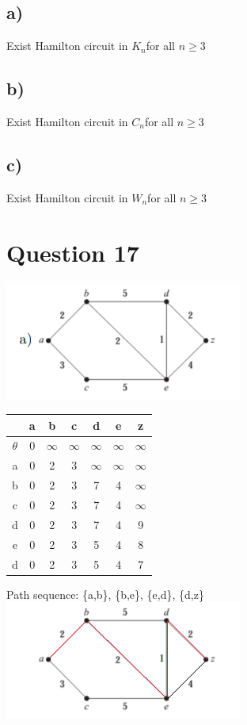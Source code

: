 \documentclass{article}
\begin{document}
\subsection*{a)}
Exist Hamilton circuit in $K_n $for all $ n \geqslant 3 $
\subsection*{b)}
Exist Hamilton circuit in $C_n $for all $ n \geqslant 3 $
\subsection*{c)}
Exist Hamilton circuit in $W_n $for all $ n \geqslant 3 $

\section*{Question 17}
\includegraphics[scale = 1.5]{Question 17/connectivity_17.a.png}
\begin{table}[h]
\begin{tabular}{c|c c c c c c}

  & a & b & c & d & e & z \\ \hline
$\theta$ & 0 & $\infty$ & $\infty$ & $\infty$ & $\infty$ & $\infty$ \\
a & 0 & 2 & 3 & $\infty$ & $\infty$ & $\infty$ \\
b & 0 & 2 & 3 & 7 & 4 & $\infty$ \\
c & 0 & 2 & 3 & 7 & 4 & $\infty$ \\
d & 0 & 2 & 3 & 7 & 4 & 9 \\
e & 0 & 2 & 3 & 5 & 4 & 8 \\
d & 0 & 2 & 3 & 5 & 4 & 7 \\
\end{tabular}
\end{table}
\newline
Path sequence: \{a,b\}, \{b,e\}, \{e,d\}, \{d,z\}
\newline
\includegraphics[scale = 1.7]{Question 17/connectivity_17.a.edited.png}
\end{document}
